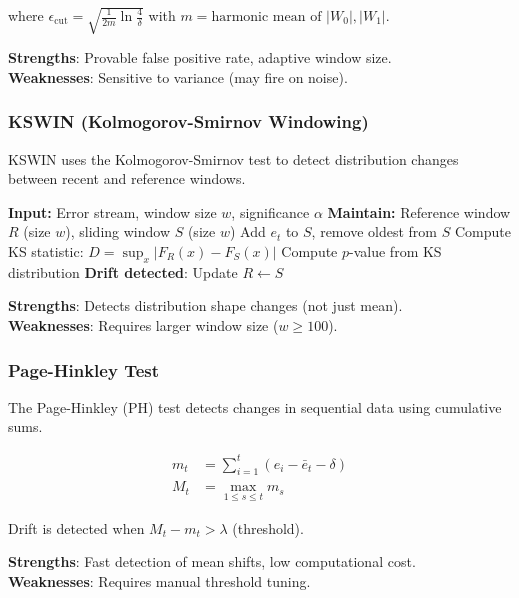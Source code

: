 where $\epsilon_{\text{cut}} = \sqrt{\frac{1}{2m} \ln \frac{4}{\delta}}$ with $m = \text{harmonic mean of } |W_0|, |W_1|$.

\textbf{Strengths}: Provable false positive rate, adaptive window size. \\
\textbf{Weaknesses}: Sensitive to variance (may fire on noise).

\subsubsection{KSWIN (Kolmogorov-Smirnov Windowing)}

KSWIN \citep{raab2020reactive} uses the Kolmogorov-Smirnov test to detect distribution changes between recent and reference windows.

\begin{algorithm}[H]
\caption{KSWIN Drift Detection}
\label{alg:kswin}
\begin{algorithmic}[1]
\State \textbf{Input:} Error stream, window size $w$, significance $\alpha$
\State \textbf{Maintain:} Reference window $R$ (size $w$), sliding window $S$ (size $w$)
    \State Add $e_t$ to $S$, remove oldest from $S$
    \State Compute KS statistic: $D = \sup_x |F_R(x) - F_S(x)|$
    \State Compute $p$-value from KS distribution
        \State \textbf{Drift detected}: Update $R \gets S$
    \EndIf
\EndFor
\end{algorithmic}
\end{algorithm}

\textbf{Strengths}: Detects distribution shape changes (not just mean). \\
\textbf{Weaknesses}: Requires larger window size ($w \geq 100$).

\subsubsection{Page-Hinkley Test}

The Page-Hinkley (PH) test \citep{page1954continuous} detects changes in sequential data using cumulative sums.

\begin{align}
m_t &= \sum_{i=1}^t (e_i - \bar{e}_t - \delta) \\
M_t &= \max_{1 \leq s \leq t} m_s
\end{align}

Drift is detected when $M_t - m_t > \lambda$ (threshold).

\textbf{Strengths}: Fast detection of mean shifts, low computational cost. \\
\textbf{Weaknesses}: Requires manual threshold tuning.

